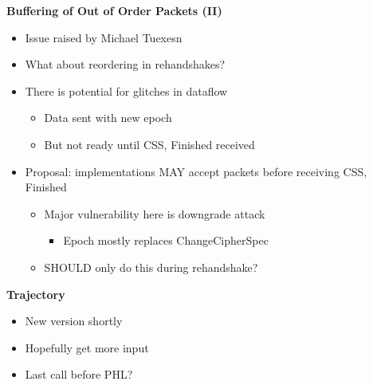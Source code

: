 \documentclass[helvetica]{seminar}
\newcommand{\heading}[1]{%
  \begin{center} 
    \large\bf 
    #1 
  \end{center} 
  \vspace{.4 in}}
\begin{document}
\begin{slide}
\heading{Buffering of Out of Order Packets (II)}

\begin{itemize}
\item Issue raised by Michael Tuexesn
\item What about reordering in rehandshakes?
\item There is potential for glitches in dataflow
\begin{itemize}
\item Data sent with new epoch
\item But not ready until \textsf{CSS}, \textsf{Finished} received
\end{itemize}
\item Proposal: implementations MAY accept packets before receiving
\textsf{CSS}, \textsf{Finished}
\begin{itemize}
\item Major vulnerability here is downgrade attack
\begin{itemize}
\item Epoch mostly replaces \textsf{ChangeCipherSpec}
\end{itemize}
\item SHOULD only do this during rehandshake?
\end{itemize}
\end{itemize}
\end{slide}


\begin{slide}
\heading{Trajectory}

\begin{itemize}
\item New version shortly
\item Hopefully get more input
\item Last call before PHL?
\end{itemize}

\end{slide}
\end{document}
